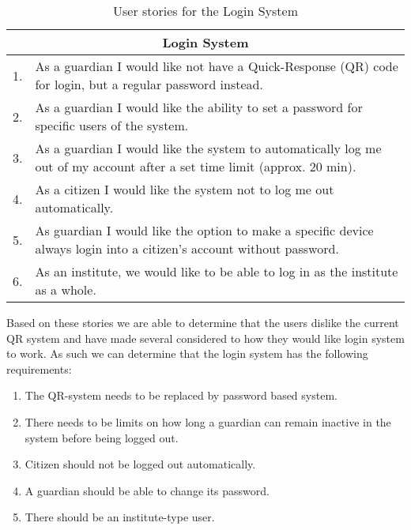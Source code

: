 \begin{table}[H]
\begin{tabular}{|c|p{12.5cm}|}
\hline 
\multicolumn{2}{|c|}{Login System}\\ \hline 
1. & As a guardian I would like not have a Quick-Response (QR) code for login,
but a regular password instead.\\ \hline 
2. & As a guardian I would like the ability to set a password for specific users
of the system.\\ \hline
3. & As a guardian I would like the system to automatically log me out of my
account after a set time limit (approx. 20 min).\\ \hline
4. & As a citizen I would like the system not to log me out automatically.\\ \hline
5. & As guardian I would like the option to make a specific device always login
into a citizen's account without password.\\ \hline
6. & As an institute, we would like to be able to log in as the institute as a
whole.\\\hline
\end{tabular}
\caption{User stories for the Login System}
\label{UserStoriesLogin}
\end{table}
 
Based on these stories we are able to determine that the users dislike the
current QR system and have made several considered to how they would like login
system to work. As such we can determine that the login system has the following
requirements:

 \begin{enumerate}
   \item The QR-system needs to be replaced by password based system.
   \item There needs to be limits on how long a guardian can remain inactive in
   the system before being logged out. 
   \item Citizen should not be logged out automatically. 
   \item A guardian should be able to change its password.
   \item There should be an institute-type user.
 \end{enumerate}






